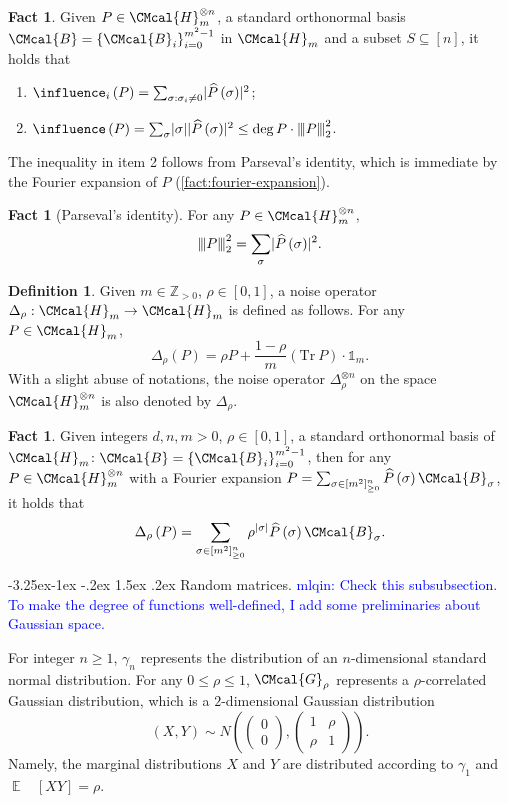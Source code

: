 \documentclass[10pt,a4paper]{article}
\makeatletter
\renewcommand{\subsubsection}{\@startsection{subsubsection}{2}{\z@}%
             {-3.25ex\@plus -1ex \@minus -.2ex}%
             {1.5ex \@plus .2ex}%
             {\normalfont\normalsize\scshape\bfseries}}
\def\B{\CMcal{B}}
\def\G{\CMcal{G}}
\def\H{\CMcal{H}}
\theoremstyle{plain}
\theoremstyle{definition}
\newtheorem{definition}[theorem]{Definition}
\newtheorem{fact}[theorem]{Fact}
\newcommand {\minusspace} {\: \! \!}
\newcommand {\Fn} [2] {\ensuremath{ #1 \minusspace \Br{ #2 } }}
\newcommand {\set} [1] {\ensuremath{ \left\lbrace #1 \right\rbrace }}
\newcommand {\br} [1] {\ensuremath{ \left( #1 \right) }}
\newcommand {\Br} [1] {\ensuremath{ \left[ #1 \right] }}
\DeclarePairedDelimiter{\abs}{\lvert}{\rvert}
\DeclareMathOperator*{\bigE}{\mathbb{E}}
\newcommand {\expec} [2] {\Fn{\bigE_{\substack{#1}}}{#2}}
\newcommand{\nnorm}[1]{{\left\vert\kern-0.25ex\left\vert\kern-0.25ex\left\vert #1
		\right\vert\kern-0.25ex\right\vert\kern-0.25ex\right\vert}}
\newcommand {\Tr} {\ensuremath{ \mathrm{Tr} }}
\newcommand {\id} {\ensuremath{\mathds{1}}}
\newcommand{\posint}{{\mathbb Z}_{>0}}
\newcommand{\herspace}[1]{\ensuremath{\H_m^{\otimes #1}}}
\newcommand{\1}{\mathbb{1}} %
\newcommand{\mlqin}[1]{\textcolor{blue}{mlqin: {#1}}}
\makeatother
\begin{document}
\begin{fact}\label{lem:partialvariance}\cite[Lemma 2.16]{qin2021nonlocal}
Given $P\in\H_m^{\otimes n}$, a standard orthonormal basis $\B=\set{\B_i}_{i=0}^{m^2-1}$ in $\H_m$ and a subset $S\subseteq[n]$, it holds that
	\begin{enumerate}
		\item $\influence_i\br{P}=\sum_{\sigma:\sigma_i\neq0}\abs{\widehat{P}\br{\sigma}}^2$;
		\item $\influence\br{P}=\sum_{\sigma}\abs{\sigma}\abs{\widehat{P}\br{\sigma}}^2\leq\deg P\cdot\nnorm{P}^2_2$.
	\end{enumerate}
\end{fact}
The inequality in item 2 follows from Parseval's identity,
which is immediate by the Fourier expansion of $P$ (\cref{fact:fourier-expansion}). 
\begin{fact}[Parseval's identity]
    For any $P\in\H_m^{\otimes n}$,
    $$\nnorm{P}_2^2=\sum_{\sigma}\abs{\widehat{P}\br{\sigma}}^2.$$
\end{fact}


\begin{definition}\label{def:bonamibeckner}
	Given $m\in\posint$, $\rho\in[0,1]$, a noise operator $\Delta_{\rho}:\H_m\rightarrow\H_m$ is defined as follows. For any $P\in\H_m$,
	\[\Delta_{\rho}\br{P}=\rho P+\frac{1-\rho}{m}\br{\Tr~P}\cdot\id_m.\]
	With a slight abuse of notations, the noise operator $\Delta_{\rho}^{\otimes n}$ on the space $\herspace{n}$ is also denoted by $\Delta_{\rho}$.
\end{definition}
\begin{fact}\label{lem:bonamibecknerdef}\cite[Lemma 3.5]{qin2021nonlocal}
	Given integers $d,n,m>0$, $\rho\in[0,1]$, a standard orthonormal basis of $\H_m$: $\B=\set{\B_i}_{i=0}^{m^2-1}$, then for any $P\in\H_m^{\otimes n}$ with a Fourier expansion $P=\sum_{\sigma\in[m^2]_{\geq 0}^n}\widehat{P}\br{\sigma}\B_{\sigma}$, it holds that
		\[\Delta_{\rho}\br{P}=\sum_{\sigma\in[m^2]_{\geq 0}^n}\rho^{\abs{\sigma}}\widehat{P}\br{\sigma}\B_{\sigma}.\]
\end{fact}


\subsubsection{Random matrices.}
\mlqin{Check this subsubsection. To make the degree of functions well-defined, I add some preliminaries about Gaussian space.}

For integer $n\geq 1$, $\gamma_n$ represents the distribution of an $n$-dimensional  standard normal distribution. For any $0\leq \rho\leq 1$, $\G_{\rho}$ represents a  $\rho$-correlated Gaussian distribution, which is a  $2$-dimensional Gaussian distribution \[\br{X,Y}\sim N\br{\begin{pmatrix}
      0 \\
      0
    \end{pmatrix},\begin{pmatrix}
                    1 & \rho \\
                    \rho & 1
                  \end{pmatrix}}.\] Namely, the marginal distributions $X$ and $Y$ are distributed according to $\gamma_1$ and $\expec{}{XY}=\rho$.
\end{document}
